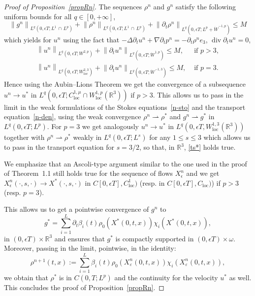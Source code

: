\documentclass[10pt]{amsart}
\theoremstyle{definition}\newtheorem{defi}[theo]{Definition}\newtheorem{rema}[theo]{Remark}\newtheorem{exam}[theo]{Example}\newtheorem{exem}[theo]{Example}\newtheorem{nota}[theo]{Notation}
\newcommand{\R}{\mathbb{R}}
\renewcommand{\leq}{\leqslant}
\renewcommand{\div}{\operatorname{div}}
\newcommand{\loc}{\operatorname{loc}}
\newcommand{\eps}{\epsilon}
\begin{document}
\begin{proof}[Proof of Proposition~\ref{propRn}]
The sequences $\rho^n$ and $g^n$ satisfy the following uniform bounds for all $q\in [0,+\infty]$,
\[
\left\|g^n\right\|_{L^q\left(0,\eps T;L^1\,\cap\,L^p\right)}+\left\|\rho^n\right\|_{L^q\left(0,\eps T;L^1\,\cap\,L^p\right)}+ \left\|\partial_t\rho^n\right\|_{L^q\left(0,\eps T;L^p+\dot{W}^{-1,p}\right)} \leq M
\]
which yields for $u^n$ using the fact that $-\Delta \partial_t u^n+ \nabla \partial_t p^n= - \partial_t \rho^n e_3$, $\div \partial_t u^n=0$,
\begin{align*}
\left\|u^n\right\|_{L^q\left(0,\eps T;W^{2,p}\right)}+ \left\|\partial_t u^n\right\|_{L^q\left(0,\eps T;\dot{W}^{1,p}\right)} \leq M, & \text{ if } p>3,\\
\left\|u^n\right\|_{L^q\left(0,\eps T;W_{\loc}^{2,3}\right)} + \left\|\partial_t u^n\right\|_{L^q\left(0,\eps T;\dot{W}^{-1,3}\right)} \leq M, & \text{ if } p=3.
\end{align*}
Hence using the Aubin--Lions Theorem we get the convergence of a subsequence $u^n \to u^* $ in $L^q(0,\eps T; C^{1,\mu}_{\loc}\cap W^{1,p}_{\loc} (\R^3))$ if $p>3$. This allows us to pass in the limit in the weak formulations of the Stokes equations~\eqref{n-sto} and the transport equation~\eqref{n-den}, using the weak convergence $\rho^n \rightharpoonup \rho^* $ and $g^n \rightharpoonup g^* $ in $L^q(0,\eps T;L^p) $. For $p=3$ we get analogously $u^n \to u^* $ in $L^q(0,\eps T,W^{1,3}_{\loc}(\R^3)) $ together with $\rho^n \rightharpoonup \rho^* $ weakly in $L^q(0,\eps T;L^s) $ for any $1 \leq s \leq 3$ which allows us to pass in the transport equation for $s=3/2$, so that, in $\R^3$, \eqref{ts*} holds true.

We emphasize that an Ascoli-type argument similar to the one used in the proof of Theorem~1.1 still holds true for the sequence of flows $X_\epsilon^n $ and we get $X^n_\epsilon(\cdot,s,\cdot) \to X^* (\cdot,s,\cdot) $ in $ C[0,\eps T], C^1_{\loc}) $ (resp. in $ C[0,\eps T], C_{\loc}) $) if $p>3$ (resp. $p=3$).

This allows us to get a pointwise convergence of $g^n$ to
\[
g^* =\underset{i=1}{\overset{L}{\sum}} \partial_t \beta_i(t) \rho_0(X^*(0,t,x))\chi_i(X^*(0,t,x)),
\]
in $(0,\eps T)\times \R^3$ and ensures that $g^*$ is compactly supported in $(0,\eps T)\times \omega$. Moreover, passing in the limit, pointwise, in the identity:
\[
\rho^{n+1}(t,x):= \underset{i=1}{\overset{L}{\sum}}\beta_i(t) \rho_0(X^n_\varepsilon(0,t,x)) \chi_i(X^n_\varepsilon(0,t,x)),
\]
we obtain that $\rho^* $ is in $ C(0,T; L^p) $ and the continuity for the velocity $u^*$ as well. This concludes the proof of Proposition~\ref{propRn}.
\end{proof}
\end{document}
